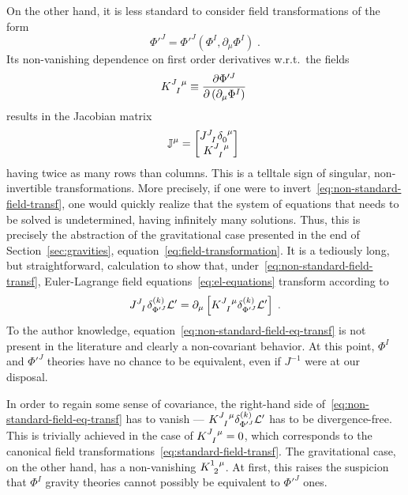 \documentclass[../../main.tex]{subfiles}
\begin{document}
On the other hand, it is less standard to consider field transformations of the form
\begin{equation}
  \label{eq:non-standard-field-transf}
  \Phi'^{J} = \Phi'^{J} \left(\Phi^I, \partial_\mu \Phi^I\right) \;.
\end{equation}
Its non-vanishing dependence on first order derivatives w.r.t.\ the fields
\begin{equation}
  \label{eq:Q}
  \tensor{K}{^J_I^\mu}\equiv \frac{\partial \Phi'^{J}}{\partial \left(\partial_\mu \Phi^I\right)} \;
\end{equation}
results in the Jacobian matrix
\begin{equation}
  \label{eq:non-standard-jacobian}
  \mathbb{J}^\mu = \begin{bmatrix}
    \tensor{J}{^{J}_I}\tensor{\delta}{_0^\mu} \\
    \tensor{K}{^J_I^\mu}
  \end{bmatrix}
  \;
\end{equation}
having twice as many rows than columns. This is a telltale sign of singular, non-invertible transformations. More precisely, if one were to invert~\eqref{eq:non-standard-field-transf}, one would quickly realize that the system of equations that needs to be solved is undetermined, having infinitely many solutions. Thus, this is precisely the abstraction of the gravitational case presented in the end of Section~\ref{sec:gravities}, equation~\eqref{eq:field-transformation}. It is a tediously long, but straightforward, calculation to show that, under~\eqref{eq:non-standard-field-transf}, Euler-Lagrange field equations~\eqref{eq:el-equations} transform according to
\begin{equation}
  \label{eq:non-standard-field-eq-transf}
  \tensor{J}{^{J}_I}\delta^{(k)}_{\Phi'^{J}}\mathcal{L}'=\partial_\mu \left[\tensor{K}{^{J}_I^\mu}\delta^{(k)}_{\Phi'^{J}}\mathcal{L}'\right] \;.
\end{equation}
To the author knowledge, equation~\eqref{eq:non-standard-field-eq-transf} is not present in the literature and clearly a non-covariant behavior. At this point, $\Phi^I$ and $\Phi'^{J}$ theories have no chance to be equivalent, even if $J^{-1}$ were at our disposal.

In order to regain some sense of covariance, the right-hand side of~\eqref{eq:non-standard-field-eq-transf} has to vanish --- $\tensor{K}{^{J}_I^\mu}\delta^{\left(k\right)}_{\Phi'^{J}}\mathcal{L}'$ has to be divergence-free. This is trivially achieved in the case of $\tensor{K}{^{J}_I^\mu}=0$, which corresponds to the canonical field transformations~\eqref{eq:standard-field-transf}. The gravitational case, on the other hand, has a non-vanishing $\tensor{K}{^1_2^\mu}$. At first, this raises the suspicion that $\Phi^I$ gravity theories cannot possibly be equivalent to $\Phi'^J$ ones.
\end{document}
